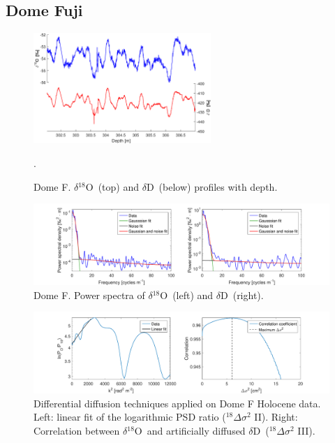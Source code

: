 \documentclass[11pt, draftcls, onecolumn]{IEEEtran} %
\numberwithin{equation}{section}
\numberwithin{table}{section}
\numberwithin{figure}{section}
\newcommand{\delOx}{$\delta{}^{18}\mathrm{O}$}
\newcommand{\delD}{$\delta\mathrm{D}$}
\begin{document}
\begin{appendices}
\clearpage
\subsection{Dome Fuji}

\begin{figure}[H]
	\vspace*{2mm}
	\begin{center}
		\includegraphics[width=0.6\textwidth]{Figure_48}
		\caption{Dome F. \delOx~(top) and \delD~(below) profiles with depth.}  \label{fig:DomeF_holo}.
	\end{center}
\end{figure}

\begin{figure}[H]
	\vspace*{2mm}
	\centering
	\includegraphics[width=1\textwidth]{Figure_49}
	\caption{Dome F. Power spectra of \delOx~(left) and \delD~(right).}  \label{fig:DomeF_fig_1}
\end{figure}

\begin{figure}[H]
	\vspace*{2mm}
	\begin{center}
		\includegraphics[width=1\textwidth]{Figure_50}
		\caption{Differential diffusion techniques applied on Dome F Holocene data. 
			Left: linear fit of the logarithmic PSD ratio ($^{18}\Delta\sigma^2$ II). Right: 
			Correlation between \delOx~and artificially diffused \delD~($^{18}\Delta\sigma^2$ III).}  \label{fig:DomeF_fig_2}
	\end{center}
\end{figure}


\end{appendices}
\end{document}
